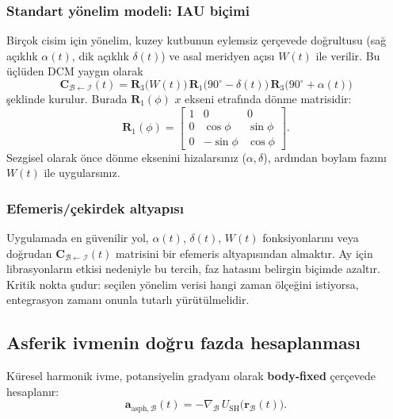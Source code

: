\subsubsection{Standart yönelim modeli: IAU biçimi}
Birçok cisim için yönelim, kuzey kutbunun eylemsiz çerçevede doğrultusu (sağ açıklık $\alpha(t)$, dik açıklık $\delta(t)$)
ve asal meridyen açısı $W(t)$ ile verilir. Bu üçlüden DCM yaygın olarak
\begin{equation}
\label{eq:iau_dcm}
\mathbf C_{\mathcal B\leftarrow\mathcal I}(t)
=
\mathbf R_3\!\big(W(t)\big)\,
\mathbf R_1\!\big(90^\circ-\delta(t)\big)\,
\mathbf R_3\!\big(90^\circ+\alpha(t)\big)
\end{equation}
şeklinde kurulur. Burada $\mathbf R_1(\phi)$ $x$ ekseni etrafında dönme matrisidir:
\[
\mathbf R_1(\phi)=
\begin{bmatrix}
1 & 0 & 0\\
0 & \cos\phi & \sin\phi\\
0 & -\sin\phi & \cos\phi
\end{bmatrix}.
\]
Sezgisel olarak önce dönme eksenini hizalarsınız ($\alpha,\delta$), ardından boylam fazını $W(t)$ ile uygularsınız.

\subsubsection{Efemeris/çekirdek altyapısı }
Uygulamada en güvenilir yol, $\alpha(t)$, $\delta(t)$, $W(t)$ fonksiyonlarını veya doğrudan
$\mathbf C_{\mathcal B\leftarrow\mathcal I}(t)$ matrisini bir efemeris altyapısından almaktır.
Ay için librasyonların etkisi nedeniyle bu tercih, faz hatasını belirgin biçimde azaltır.
Kritik nokta şudur: seçilen yönelim verisi hangi zaman ölçeğini istiyorsa, entegrasyon zamanı onunla tutarlı yürütülmelidir.

\newpage
\subsection{Asferik ivmenin doğru fazda hesaplanması}
\label{subsec:asph_acc_pipeline}

Küresel harmonik ivme, potansiyelin gradyanı olarak \textbf{body-fixed} çerçevede hesaplanır:
\begin{equation}
\label{eq:a_asph_bodyfixed}
\mathbf a_{\text{asph},\mathcal B}(t)= -\nabla_{\mathcal B}\,
U_{\text{SH}}\!\big(\mathbf r_{\mathcal B}(t)\big).
\end{equation}

